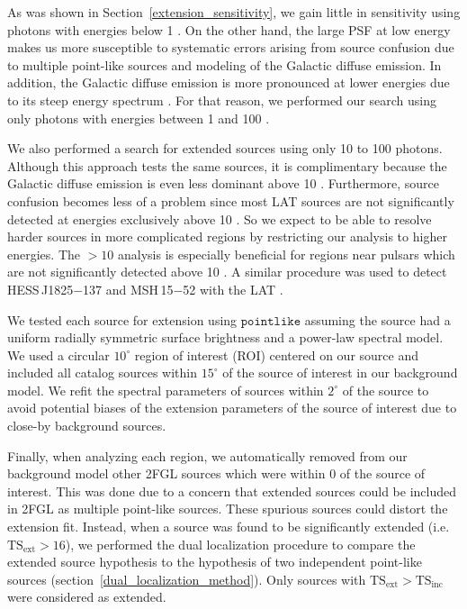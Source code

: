 \documentclass[12pt,preprint]{aastex}
\newcommand{\gev}{\text{GeV}\xspace}
\newcommand{\tsext}{{\ensuremath{\text{TS}_{\text{ext}}}}\xspace}
\newcommand{\tsinc}{\ensuremath{\text{TS}_{\text{inc}}}\xspace}
\newcommand{\pointlike}{\ensuremath{\mathtt{pointlike}}\xspace}
\newcommand{\degree}{^\circ\xspace}
\begin{document}
As was shown in Section~\ref{extension_sensitivity}, we gain little in sensitivity using photons with energies
below 1 \gev. On the other hand, the large PSF at low energy makes us
more susceptible to systematic errors arising from source confusion due
to multiple point-like sources and modeling of the
Galactic diffuse emission. In addition, the Galactic diffuse emission
is more pronounced at lower energies due to its steep energy spectrum
\citep{intermediate_diffuse_lat}.
For that reason, we performed our search using only photons with
energies between 1 \gev and 100 \gev. 

We also performed a search for extended sources using only 10 \gev to 100 \gev photons. 
Although this approach tests the same
sources, it is complimentary because the Galactic diffuse
emission is even less dominant above 10 \gev. Furthermore, source
confusion becomes less of a problem since most LAT sources are not
significantly detected at energies exclusively above 10 \gev. So we
expect to be able to resolve harder sources in more complicated regions
by restricting our analysis to higher energies. The $>10$ \gev
analysis is
especially
beneficial for regions near pulsars which are not significantly detected 
above 10 \gev. A similar procedure was
used to detect HESS\,J1825$-$137 and MSH\,15$-$52 with the LAT
\citep{msh1552,fermi_hess_j1825}.

We tested each source for extension using
\pointlike
assuming the source had a uniform radially symmetric surface brightness
and a power-law spectral model.
We used a circular $10\degree$ region of interest (ROI) centered on our source and
included all catalog sources within $15\degree$ of the source of interest
in our background model.
We refit the spectral parameters of sources within $2\degree$ of the source
to avoid potential biases of the extension parameters of the source of
interest due to close-by background sources.

Finally, when analyzing each region, we automatically removed from
our background model other 2FGL sources which were within 0 of
the source of interest. This was done due
to a concern that extended sources could be included in 2FGL as multiple
point-like sources. These spurious sources could distort the extension
fit.  Instead, when a source was found to be significantly extended
(i.e. $\tsext>16$), we performed the dual localization procedure 
to compare the extended source
hypothesis to the hypothesis of two independent point-like sources
(section~\ref{dual_localization_method}). Only
sources with $\tsext>\tsinc$ were considered as extended.
\end{document}
